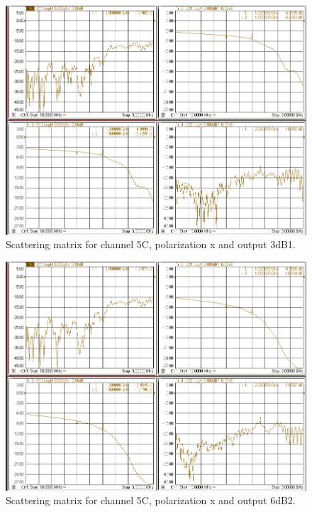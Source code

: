 \documentclass[12pt,a4paper,oneside]{article}
\begin{document}
\begin{figure}[H]
\centering
\includegraphics[width=0.9\linewidth]{VNA_results/5Cx_3dB1.png}
\caption{Scattering matrix for channel 5C, polarization x and output 3dB1.}
\label{fig:5Cx_3dB1}
\end{figure}


\begin{figure}[H]
\centering
\includegraphics[width=0.9\linewidth]{VNA_results/5Cx_6dB2.png}
\caption{Scattering matrix for channel 5C, polarization x and output 6dB2.}
\label{fig:5Cx_6dB2}
\end{figure}
\end{document}
